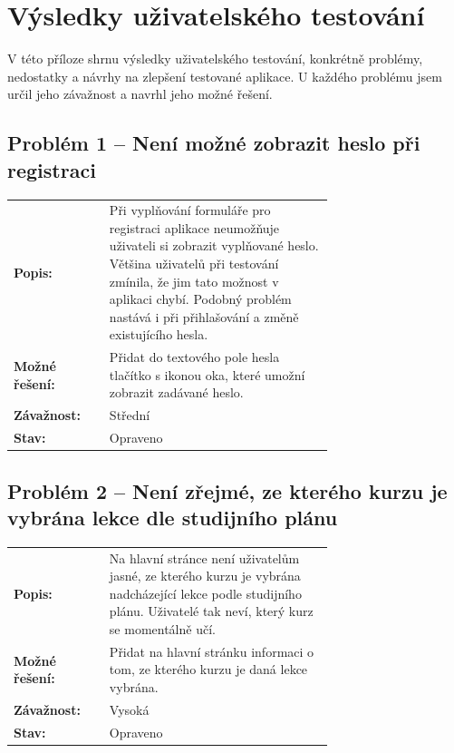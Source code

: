 \chapter{Výsledky uživatelského testování}\label{chapter:test-problems}

V této příloze shrnu výsledky uživatelského testování, konkrétně problémy, nedostatky a návrhy na zlepšení testované aplikace. U každého problému jsem určil jeho závažnost a navrhl jeho možné řešení.

\section*{Problém 1 – Není možné zobrazit heslo při registraci}

\begin{tabular}{lp{0.7\linewidth}}
    \textbf{Popis:} & Při vyplňování formuláře pro registraci aplikace neumožňuje uživateli si zobrazit vyplňované heslo. Většina uživatelů při testování zmínila, že jim tato možnost v aplikaci chybí. Podobný problém nastává i při přihlašování a změně existujícího hesla.\\
    \textbf{Možné řešení:} & Přidat do textového pole hesla tlačítko s ikonou oka, které umožní zobrazit zadávané heslo. \\
    \textbf{Závažnost:} & Střední \\
    \textbf{Stav:} & Opraveno  \\
\end{tabular}

\section*{Problém 2 – Není zřejmé, ze kterého kurzu je vybrána lekce dle studijního plánu}

\begin{tabular}{lp{0.7\linewidth}}
    \textbf{Popis:} & Na hlavní stránce není uživatelům jasné, ze kterého kurzu je vybrána nadcházející lekce podle studijního plánu. Uživatelé tak neví, který kurz se momentálně učí. \\
    \textbf{Možné řešení:} & Přidat na hlavní stránku informaci o tom, ze kterého kurzu je daná lekce vybrána. \\
    \textbf{Závažnost:} & Vysoká \\
    \textbf{Stav:} & Opraveno  \\
\end{tabular}

